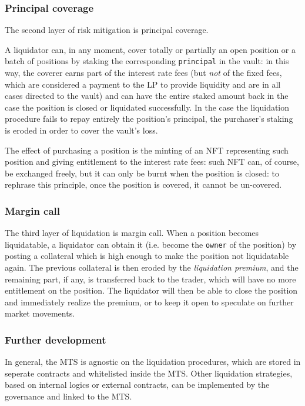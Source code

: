 \documentclass [10pt, fancyhdr, twoside] {article}
\begin{document}
\subsubsection{Principal coverage}\label{positionPurchase}

The second layer of risk mitigation is principal coverage.

A liquidator can, in any moment, cover totally or partially an open position or a batch of positions by staking the corresponding \verb|principal| in the vault: in this way, the coverer earns part of the interest rate fees (but \textit{not} of the fixed fees, which are considered a payment to the LP to provide liquidity and are in all cases directed to the vault) and can have the entire staked amount back in the case the position is closed or liquidated successfully. In the case the liquidation procedure fails to repay entirely the position's principal, the purchaser's staking is eroded in order to cover the vault's loss.

The effect of purchasing a position is the minting of an NFT representing such position and giving entitlement to the interest rate fees: such NFT can, of course, be exchanged freely, but it can only be burnt when the position is closed: to rephrase this principle, once the position is covered, it cannot be un-covered.

\subsubsection{Margin call}\label{marginCall}
 
The third layer of liquidation is margin call. When a position becomes liquidatable, a liquidator can obtain it (i.e. become the \verb|owner| of the position) by posting a collateral which is high enough to make the position not liquidatable again. The previous collateral is then eroded by the \textit{liquidation premium}, and the remaining part, if any, is transferred back to the trader, which will have no more entitlement on the position. The liquidator will then be able to close the position and immediately realize the premium, or to keep it open to speculate on further market movements.

\subsubsection{Further development}
In general, the MTS is agnostic on the liquidation procedures, which are stored in seperate contracts and whitelisted inside the MTS. Other liquidation strategies, based on internal logics or external contracts, can be implemented by the governance and linked to the MTS.
\end{document}
